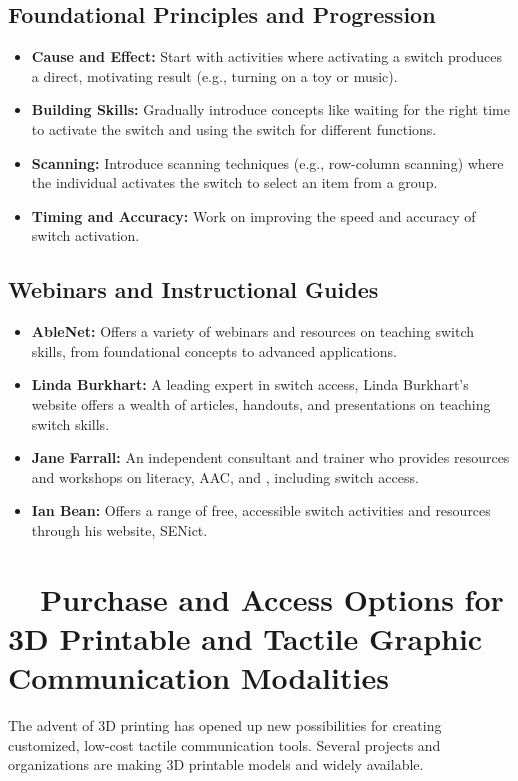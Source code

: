 \subsection{Foundational Principles and Progression}\label{app6:switch-principles}
\begin{itemize}
	\item \textbf{Cause and Effect:} Start with activities where activating a switch produces a direct, motivating result (e.g., turning on a toy or music).
	\item \textbf{Building Skills:} Gradually introduce concepts like waiting for the right time to activate the switch and using the switch for different functions.
	\item \textbf{Scanning:} Introduce scanning techniques (e.g., row-column scanning) where the individual activates the switch to select an item from a group.
	\item \textbf{Timing and Accuracy:} Work on improving the speed and accuracy of switch activation.
\end{itemize}

\subsection{Webinars and Instructional Guides}\label{app6:switch-guides}
\begin{itemize}
	\item \textbf{AbleNet:} Offers a variety of webinars and resources on teaching switch skills, from foundational concepts to advanced applications.
	\item \textbf{Linda Burkhart:} A leading expert in switch access, Linda Burkhart's website offers a wealth of articles, handouts, and presentations on teaching switch skills.
	\item \textbf{Jane Farrall:} An independent consultant and trainer who provides resources and workshops on literacy, AAC, and , including switch access.
	\item \textbf{Ian Bean:} Offers a range of free, accessible switch activities and resources through his website, SENict.
\end{itemize}

\section{~~Purchase and Access Options for 3D Printable and Tactile Graphic Communication Modalities}\label{app6:3d-comm}
The advent of 3D printing has opened up new possibilities for creating customized, low-cost tactile communication tools. Several projects and organizations are making 3D printable models and  widely available.


